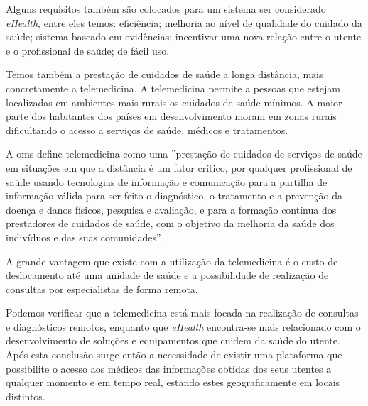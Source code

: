 \par
Alguns requisitos tamb\'em s\~ao colocados \cite{ehealth} para um sistema ser considerado \textit{eHealth}, entre eles temos: efici\^encia; melhoria ao n\'ivel de qualidade do cuidado da sa\'ude; sistema baseado em evid\^encias; incentivar uma nova rela\c c\~ao entre o utente e o profissional de sa\'ude; de f\'acil uso.
\par
Temos também a presta\c c\~ao de cuidados de sa\'ude a longa dist\^ancia, mais concretamente a telemedicina. A telemedicina permite a pessoas que estejam localizadas em ambientes mais rurais os cuidados de sa\'ude m\'inimos. A maior parte dos habitantes dos pa\'ises em desenvolvimento moram em zonas rurais dificultando o acesso a servi\c cos de sa\'ude, m\'edicos e tratamentos.
\par
A \gls{oms} define telemedicina como \cite{ehealth_telemedicine} uma ''presta\c c\~ao de cuidados de servi\c cos de sa\'ude em situa\c c\~oes em que a dist\^ancia \'e um fator cr\'itico, por qualquer profissional de sa\'ude usando tecnologias de informa\c c\~ao e comunica\c c\~ao para a partilha de informa\c c\~ao v\'alida para ser feito o diagn\'ostico, o tratamento e a preven\c c\~ao da doen\c ca e danos f\'isicos, pesquisa e avalia\c c\~ao, e para a forma\c c\~ao cont\'inua dos prestadores de cuidados de sa\'ude, com o objetivo da melhoria da sa\'ude dos indiv\'iduos e das suas comunidades''.
\par
A grande vantagem que existe com a utiliza\c c\~ao da telemedicina \'e o custo de deslocamento at\'e uma unidade de sa\'ude e a possibilidade de realiza\c c\~ao de consultas por especialistas de forma remota.
\par
Podemos verificar que a telemedicina est\'a mais focada na realiza\c c\~ao de consultas e diagn\'osticos remotos, enquanto que \textit{eHealth} encontra-se mais relacionado com o desenvolvimento de solu\c c\~oes e equipamentos que cuidem da sa\'ude do utente. Ap\'os esta conclus\~ao surge ent\~ao a necessidade de existir uma plataforma que possibilite o acesso aos m\'edicos das informa\c c\~oes obtidas dos seus utentes a qualquer momento e em tempo real, estando estes geograficamente em locais distintos.





